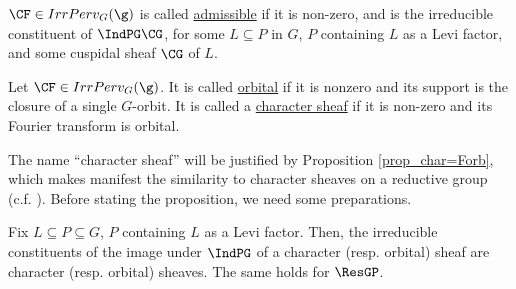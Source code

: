 \begin{definition}
    $\CF\in IrrPerv_G(\g)$ is called \underline{admissible} if it is non-zero, and is the irreducible constituent of $\IndPG\CG$, for some $L\subseteq P$ in $G$, $P$ containing $L$ as a Levi factor, and some cuspidal sheaf $\CG$ of $L$.
\end{definition}

\begin{definition}
    Let $\CF\in IrrPerv_G(\g)$. It is called \underline{orbital} if it is nonzero and its support is the closure of a single $G$-orbit. It is called a \underline{character sheaf} if it is non-zero and its Fourier transform is orbital.
\end{definition}

The name “character sheaf” will be justified by Proposition \ref{prop_char=Forb}, which makes manifest the similarity to character sheaves on a reductive group (c.f. \cite[]{mirkovic_characteristic_1988}). Before stating the proposition, we need some preparations.

\begin{lemma}\label{lem_res_ind_char_orb}
    Fix $L\subseteq P\subseteq G$, $P$ containing $L$ as a Levi factor. Then, the irreducible constituents of the image under $\IndPG$ of a character (resp. orbital) sheaf are character (resp. orbital) sheaves. The same holds for $\ResGP$.
\end{lemma}

